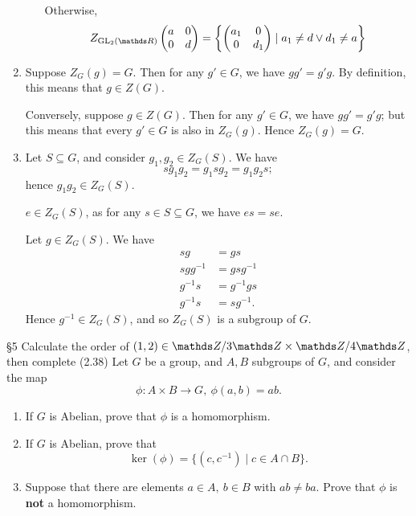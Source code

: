 \documentclass{homework}
\begin{document}
\begin{solution}
\begin{enumerate}[label=(\alph*)]
\begin{enumerate}
            Otherwise, \[Z_{\GL_2(\R)}\begin{pmatrix} a&0\\0&d \end{pmatrix} =\left\{ \begin{pmatrix}
          a_1&0\\0&d_1\end{pmatrix}\mid a_1\neq d\lor d_1\neq a  \right\}\]
      \end{enumerate}
    \item Suppose $Z_G(g)=G$. Then for any $g'\in G$, we have $gg'=g'g$. By definition, this means
      that $g\in Z(G)$.
    
      Conversely, suppose $g\in Z(G)$. Then for any $g'\in G$, we have $gg'=g'g$; but this means
      that every $g'\in G$ is also in $Z_G(g)$. Hence $Z_G(g)=G$.
    \item Let $S\subseteq G$, and consider $g_1,g_2\in Z_G(S)$. We have
      \[
        sg_1g_2=g_1sg_2=g_1g_2s
      ;\] hence $g_1g_2\in Z_G(S)$.

      $e\in Z_G(S)$, as for any $s\in S\subseteq G$, we have $es=se$.

      Let $g\in Z_G(S)$. We have
      \begin{align*}
        sg&= gs \\
        sgg^{-1}&=gsg^{-1}\\
        g^{-1}s&=g^{-1}gs\\
        g^{-1}s&=sg^{-1}
      .\end{align*} Hence $g^{-1}\in Z_G(S)$, and so $Z_G(S)$ is a subgroup of $G$.
  \end{enumerate}
\end{solution}


\begin{problem}{\S 5}
  Calculate the order of $(1,2)\in \Z / 3\Z \times \Z / 4\Z$, then complete (2.38)
  Let $G$ be a group, and $A,B$ subgroups of $G$, and consider the map \[
    \phi: A\times B\to G,\ \phi(a,b)=ab
  .\] 
  \begin{enumerate}[label=(\alph*)]
    \item If $G$ is Abelian, prove that $ \phi$ is a homomorphism.
    \item If $G$ is Abelian, prove that \[
          \ker(\phi)=\{(c,c^{-1})\mid c\in A\cap B\} 
      .\] 
    \item Suppose that there are elements $a\in A,\ b\in B$ with $ab\neq ba$. Prove that $\phi$ is
      \textbf{not} a homomorphism.
  \end{enumerate}
\end{problem}
\end{document}
